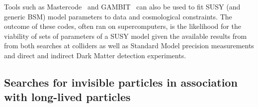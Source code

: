 Tools such as Mastercode~\cite{Bagnaschi:2017tru} and GAMBIT~\cite{Athron:2017ard} can also be used to fit SUSY (and generic BSM)
model parameters to data and cosmological constraints. The outcome of these codes, often ran on supercomputers, 
is the likelihood for the viability of sets of parameters of a SUSY model given the available results from
from both searches at colliders as well as Standard Model precision measurements and direct and indirect Dark Matter detection experiments.









\subsection{Searches for invisible particles in association with long-lived particles}
\label{sec:results_LLPSearches}

